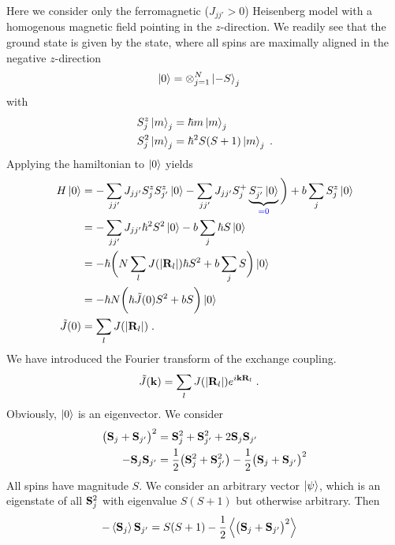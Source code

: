 Here we consider only the   ferromagnetic ($J_{jj'}>0$) Heisenberg model
with a homogenous magnetic field pointing in the $z$-direction.
We readily see that the ground state is given by the 
state, where all spins are maximally aligned in the negative $z$-direction
%
\begin{align}\label{eq:}
\ket{0} &= \otimes_{j=1}^{N} \ket{-S}_{j}
\end{align}
%
with
\begin{subequations}\label{eq:}
\begin{align}
S_{j}^{z} \ket{m}_{j} &=\hbar m \ket{m}_{j}\\
S_{j}^{2} \ket{m}_{j} &=\hbar^{2} S(S+1) \ket{m}_{j}\;.
\end{align}
\end{subequations}
Applying the hamiltonian to $\ket{0}$ yields
%
\begin{align*}
H\ket{0} &= - \sum_{jj'} J_{jj'} S_{j}^{z}  S_{j'}^{z}\ket{0}
- \sum_{jj'} J_{jj'} S_{j}^{+} \underbrace{
S_{j'}^{-}\ket{0}
}_{\color{blue} = 0}
\bigg) + b \sum_{j} S^{z}_{j}\ket{0}\\
&= - \sum_{jj'} J_{jj'} \hbar^{2} S^{2}  \ket{0} - b \sum_{j} \hbar S \ket{0}\\
&=-\hbar  \bigg(N \sum_{l} J(|\mathbf R_{l}|) \hbar  S^{2}  + b \sum_{j}  S \bigg)\ket{0}\\
&=-\hbar  N \bigg(\hbar \tilde J(0)  S^{2}  + b   S \bigg)\ket{0}\\
\tilde J(0) &=  \sum_{l} J(|\mathbf R_{l}|) \;.
\end{align*}
%
We have introduced the Fourier transform of the exchange coupling.
%
\begin{align}\label{eq:heisenberg:J:q}
\tilde J(\mathbf k) &= \sum_{l} J(|\mathbf R_{l}|) e^{i \mathbf k \mathbf R_{l}}\;.
\end{align}
%
Obviously, $\ket{0}$ is an eigenvector.
We consider
%
\begin{align*}
\big( \mathbf S_{j} + \mathbf S_{j'} \big)^{2} &= \mathbf S_{j}^{2}+\mathbf S_{j'}^{2} + 2 \mathbf S_{j} \mathbf S_{j'}\\
- \mathbf S_{j} \mathbf S_{j'} &= \frac{1}{2}\big(\mathbf S_{j}^{2}+\mathbf S_{j'}^{2} \big)- 
\frac{1}{2}\big( \mathbf S_{j} + \mathbf S_{j'} \big)^{2}
\end{align*}
%
All spins have magnitude $S$. We consider an arbitrary vector $\ket{\psi}$, which is an eigenstate 
of all $\mathbf S_{j}^{2}$  with eigenvalue $S(S+1)$ but otherwise arbitrary. Then
\begin{align*}
- \left\langle\mathbf S_{j}\right\rangle \mathbf S_{j'} &= S(S+1) 
- \frac{1}{2}\left\langle\big( \mathbf S_{j} + \mathbf S_{j'} \big)^{2}\right\rangle
\end{align*}
